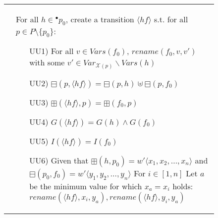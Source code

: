 \begin{figure}
\begin{adjustbox}{center}
\begin{tabular}{|p{70mm}|p{70mm}|}
\begin{itemize}[leftmargin=10mm]
        \end{itemize}

        &
        For all $h\in{}^\bullet p_0$, create a transition $\langle hf\rangle$ s.t. for all $p\in P\setminus\{p_0\}$:
        \begin{itemize}[leftmargin=10mm]
            \item[UU1)] For all $v \in Vars(f_0)$, $rename(f_0,v,v')$ with some $v' \in Var_{\mathcal{X}(p)}\backslash Vars(h)$
            \item[UU2)] $\boxminus(p,\langle hf\rangle)=\boxminus(p,h)\uplus \boxminus(p,f_0)$
            \item[UU3)] $\boxplus(\langle hf\rangle,p)=\boxplus(f_0,p)$
            \item[UU4)] $G(\langle hf\rangle) = G(h) \land G(f_0)$
            \item[UU5)] $I(\langle hf\rangle) = I(f_0)$
            \item[UU6)] Given that $\boxplus(h,p_0) = w{}'\langle x_1, x_2, \dots, x_n \rangle$ and $\boxminus(p_0, f_0) = w{}'\langle y_1, y_2, \dots, y_n \rangle$\newline
            For $i\in[1,n]$\newline
            Let $a$ be the minimum value for which $x_a = x_i$ holds:\newline
            $rename(\langle hf \rangle, x_i, y_a), rename(\langle hf \rangle, y_i, y_a)$

\end{itemize}
\end{tabular}
\end{adjustbox}
\end{figure}
